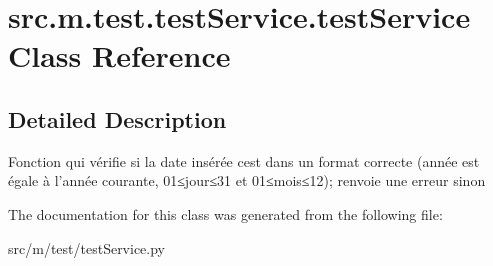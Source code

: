 \hypertarget{classsrc_1_1m_1_1test_1_1test_service_1_1test_service}{}\section{src.\+m.\+test.\+test\+Service.\+test\+Service Class Reference}
\label{classsrc_1_1m_1_1test_1_1test_service_1_1test_service}


\subsection{Detailed Description}
\begin{DoxyVerb}Fonction qui vérifie si la date insérée cest dans un format correcte (année est égale à l'année courante, 01≤jour≤31 et 01≤mois≤12); renvoie une erreur sinon\end{DoxyVerb}
 

The documentation for this class was generated from the following file\+:\begin{DoxyCompactItemize}
\item 
src/m/test/test\+Service.\+py\end{DoxyCompactItemize}
